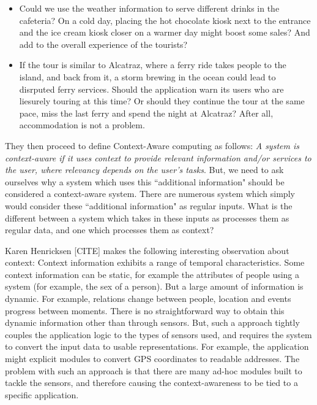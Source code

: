 \begin{itemize}
\item Could we use the weather information to serve different drinks in the cafeteria? On a cold day, placing the hot chocolate kiosk next to the entrance and the ice cream kiosk closer on a warmer day might boost some sales? And add to the overall experience of the tourists?
\item If the tour is similar to Alcatraz, where a ferry ride takes people to the island, and back from it, a storm brewing in the ocean could lead to disrputed ferry services. Should the application warn its users who are liesurely touring at this time? Or should they continue the tour at the same pace, miss the last ferry and spend the night at Alcatraz? After all, accommodation is not a problem.
\end{itemize}

They then proceed to define Context-Aware computing as follows: \textit{A system is context-aware if it uses context to provide relevant information and/or services to the user, where relevancy depends on the user's tasks}. But, we need to ask ourselves why a system which uses this ``additional information" should be considered a context-aware system. There are numerous system which simply would consider these ``additional information" as regular inputs. What is the different between a system which takes in these inputs as processes them as regular data, and one which processes them as context?

Karen Henricksen [CITE] makes the following interesting observation about context: Context information exhibits a range of temporal characteristics. Some context information can be static, for example the attributes of people using a system (for example, the sex of a person). But a large amount of information is dynamic. For example, relations change between people, location and events progress between moments. There is no straightforward way to obtain this dynamic information other than through sensors. But, such a approach tightly couples the application logic to the types of sensors used, and requires the system to convert the input data to usable representations. For example, the application might explicit modules to convert GPS coordinates to readable addresses. The problem with such an approach is that there are many ad-hoc modules built to tackle the sensors, and therefore causing the context-awareness to be tied to a specific application.

